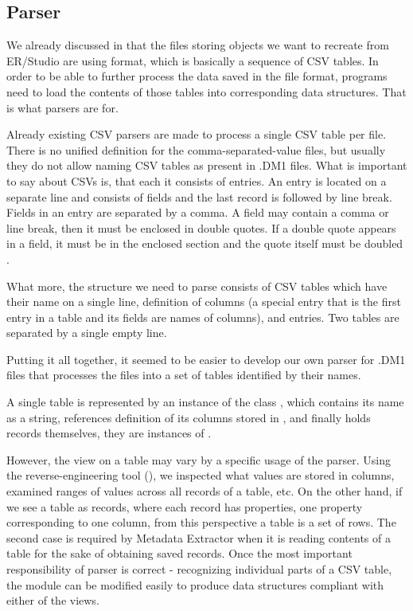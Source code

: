 \subsection{Parser}
\label{subsec:dm1_parser}

We already discussed in  that the files storing objects we want to recreate from ER/Studio are using format, which is basically a sequence of CSV tables. 
In order to be able to further process the data saved in the file format, programs need to load the contents of those tables into corresponding data structures. That is what parsers are for.

Already existing CSV parsers are made to process a single CSV table per file. There is no unified definition for the comma-separated-value files, but usually they do not allow naming CSV tables as present in .DM1 files.
What is important to say about CSVs is, that each it consists of entries. 
An entry is located on a separate line and consists of fields and the last record is followed by line break. 
Fields in an entry are separated by a comma.
A field may contain a comma or line break, then it must be enclosed in double quotes.
If a double quote appears in a field, it must be in the enclosed section and the quote itself must be doubled \cite{RfcCSV}.

What more, the structure we need to parse consists of CSV tables which have their name on a single line, definition of columns (a special entry that is the first entry in a table and its fields are names of columns), and entries. 
Two tables are separated by a single empty line.

Putting it all together, it seemed to be easier to develop our own parser for .DM1 files that processes the files into a set of tables identified by their names.

A single table is represented by an instance of the class , which contains its name as a string, references definition of its columns stored in , and finally holds records themselves, they are instances of .

However, the view on a table may vary by a specific usage of the parser. 
Using the reverse-engineering tool (), we inspected what values are stored in columns, examined ranges of values across all records of a table, etc.
On the other hand, if we see a table as records, where each record has properties, one property corresponding to one column, from this perspective a table is a set of rows.
The second case is required by Metadata Extractor when it is reading contents of a table for the sake of obtaining saved records. 
Once the most important responsibility of parser is correct - recognizing individual parts of a CSV table, the module can be modified easily to produce data structures compliant with either of the views.

